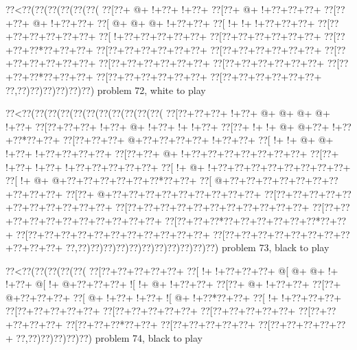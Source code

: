 \vbox{\vbox{\goo
\0??<\0??(\0??(\0??(\0??(\0??(\0??(
\0??[\0??+\- @+\- !+\0??+\- !+\0??+
\0??[\0??+\- @+\- !+\0??+\0??+\0??+
\0??[\0??+\0??+\- @+\- !+\0??+\0??+
\0??[\- @+\- @+\- @+\- !+\0??+\0??+
\0??[\- !+\- !+\- !+\0??+\0??+\0??+
\0??[\0??+\0??+\0??+\0??+\0??+\0??+
\0??[\- !+\0??+\0??+\0??+\0??+\0??+
\0??[\0??+\0??+\0??+\0??+\0??+\0??+
\0??[\0??+\0??+\0??*\0??+\0??+\0??+
\0??[\0??+\0??+\0??+\0??+\0??+\0??+
\0??[\0??+\0??+\0??+\0??+\0??+\0??+
\0??[\0??+\0??+\0??+\0??+\0??+\0??+
\0??[\0??+\0??+\0??+\0??+\0??+\0??+
\0??[\0??+\0??+\0??+\0??+\0??+\0??+
\0??[\0??+\0??+\0??*\0??+\0??+\0??+
\0??[\0??+\0??+\0??+\0??+\0??+\0??+
\0??[\0??+\0??+\0??+\0??+\0??+\0??+
\0??,\0??)\0??)\0??)\0??)\0??)\0??)
}
\hfil problem 72, white to play\hfil\break
}

\vbox{\vbox{\goo
\0??<\0??(\0??(\0??(\0??(\0??(\0??(\0??(\0??(\0??(\0??(\0??(
\0??[\0??+\0??+\0??+\- !+\0??+\- @+\- @+\- @+\- @+\- !+\0??+
\0??[\0??+\0??+\0??+\- !+\0??+\- @+\- !+\0??+\- !+\- !+\0??+
\0??[\0??+\- !+\- !+\- @+\- @+\0??+\- !+\0??+\0??*\0??+\0??+
\0??[\0??+\0??+\0??+\- @+\0??+\0??+\0??+\0??+\- !+\0??+\0??+
\0??[\- !+\- !+\- @+\- @+\- !+\0??+\- !+\0??+\0??+\0??+\0??+
\0??[\0??+\0??+\- @+\- !+\0??+\0??+\0??+\0??+\0??+\0??+\0??+
\0??[\0??+\- !+\0??+\- !+\0??+\- !+\0??+\0??+\0??+\0??+\0??+
\0??[\- !+\- @+\- !+\0??+\0??+\0??+\0??+\0??+\0??+\0??+\0??+
\0??[\- !+\- @+\- @+\0??+\0??+\0??+\0??+\0??+\0??*\0??+\0??+
\0??[\- @+\0??+\0??+\0??+\0??+\0??+\0??+\0??+\0??+\0??+\0??+
\0??[\0??+\- @+\0??+\0??+\0??+\0??+\0??+\0??+\0??+\0??+\0??+
\0??[\0??+\0??+\0??+\0??+\0??+\0??+\0??+\0??+\0??+\0??+\0??+
\0??[\0??+\0??+\0??+\0??+\0??+\0??+\0??+\0??+\0??+\0??+\0??+
\0??[\0??+\0??+\0??+\0??+\0??+\0??+\0??+\0??+\0??+\0??+\0??+
\0??[\0??+\0??+\0??*\0??+\0??+\0??+\0??+\0??+\0??*\0??+\0??+
\0??[\0??+\0??+\0??+\0??+\0??+\0??+\0??+\0??+\0??+\0??+\0??+
\0??[\0??+\0??+\0??+\0??+\0??+\0??+\0??+\0??+\0??+\0??+\0??+
\0??,\0??)\0??)\0??)\0??)\0??)\0??)\0??)\0??)\0??)\0??)\0??)
}
\hfil problem 73, black to play\hfil\break
}

\vbox{\vbox{\goo
\0??<\0??(\0??(\0??(\0??(\0??(
\0??[\0??+\0??+\0??+\0??+\0??+
\0??[\- !+\- !+\0??+\0??+\0??+
\- @[\- @+\- @+\- !+\- !+\0??+
\- @[\- !+\- @+\0??+\0??+\0??+
\- ![\- !+\- @+\- !+\0??+\0??+
\0??[\0??+\- @+\- !+\0??+\0??+
\0??[\0??+\- @+\0??+\0??+\0??+
\0??[\- @+\- !+\0??+\- !+\0??+
\- ![\- @+\- !+\0??*\0??+\0??+
\0??[\- !+\- !+\0??+\0??+\0??+
\0??[\0??+\0??+\0??+\0??+\0??+
\0??[\0??+\0??+\0??+\0??+\0??+
\0??[\0??+\0??+\0??+\0??+\0??+
\0??[\0??+\0??+\0??+\0??+\0??+
\0??[\0??+\0??+\0??*\0??+\0??+
\0??[\0??+\0??+\0??+\0??+\0??+
\0??[\0??+\0??+\0??+\0??+\0??+
\0??,\0??)\0??)\0??)\0??)\0??)
}
\hfil problem 74, black to play\hfil\break
}

